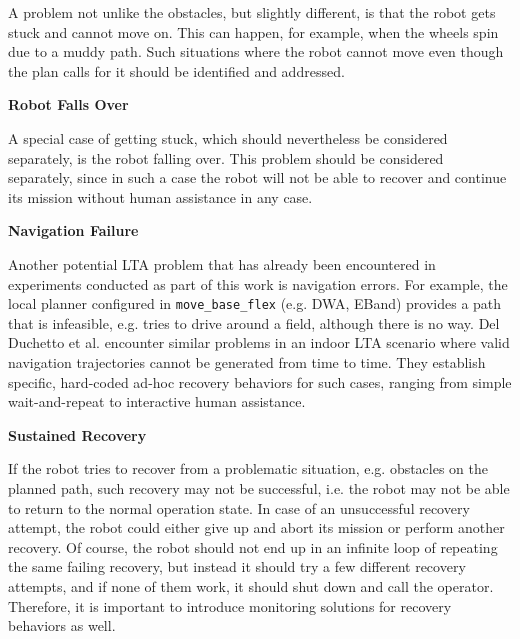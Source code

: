 \documentclass[english, master, utf8]{base/thesis_KBS}
\newcommand{\code}[1]{\colorbox{light-gray}{\texttt{#1}}}
\begin{document}
\noindent
A problem not unlike the obstacles, but slightly different, is that the robot gets stuck and cannot move on. This can happen, for example, when the wheels spin due 
to a muddy path. Such situations where the robot cannot move even though the plan calls for it should be identified and addressed.\newline

\noindent
\textbf{Robot Falls Over}\newline

\noindent
A special case of getting stuck, which should nevertheless be considered separately, is the robot falling over.
This problem should be considered separately, since in such a case the robot will not be able to recover and continue its mission without human assistance in any case.\newline

\noindent
\textbf{Navigation Failure}\newline

\noindent
Another potential LTA problem that has already been encountered in experiments conducted as part of this work is navigation errors.
For example, the local planner configured in \code{move\_base\_flex} (e.g. DWA, EBand) provides a path that is infeasible, e.g. tries to drive around a field, 
although there is no way. Del Duchetto et al. encounter similar problems in an indoor LTA scenario where valid navigation trajectories cannot be generated from time to time.
They establish specific, hard-coded ad-hoc recovery behaviors for such cases, ranging from simple wait-and-repeat to interactive human assistance. \cite{DelDuchetto:2018}\newline

\noindent
\textbf{Sustained Recovery}\newline

\noindent
If the robot tries to recover from a problematic situation, e.g. obstacles on the planned path, such recovery may not be successful, i.e. the robot may not be able
to return to the normal operation state. In case of an unsuccessful recovery attempt, the robot could either give up and abort its mission or perform another recovery.
Of course, the robot should not end up in an infinite loop of repeating the same failing recovery, but instead it should try a few different recovery attempts,
and if none of them work, it should shut down and call the operator. Therefore, it is important to introduce monitoring solutions for recovery behaviors as well.\newline
\end{document}
